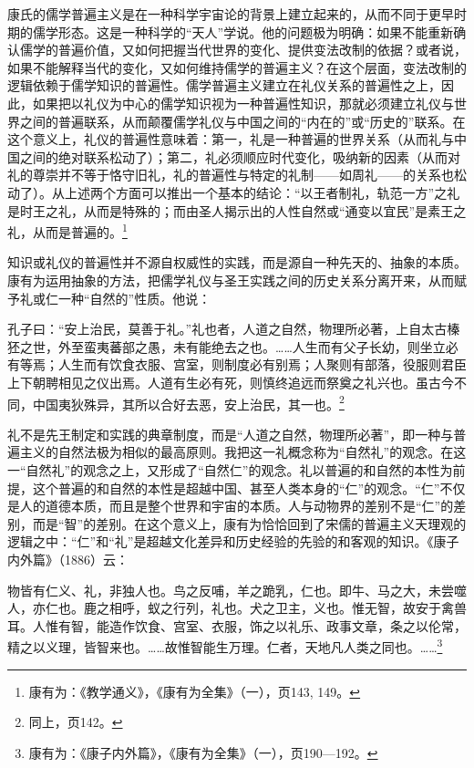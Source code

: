 \documentclass[a4paper, 12pt, openright]{ctexbook}
\renewenvironment{quote}
  {\list{}{\rightmargin2\ccwd \leftmargin2\ccwd \itemindent=2\ccwd \listparindent=2\ccwd}%
   \item\relax\small\kaishu\color{black}}
  {\endlist}
\begin{document}
康氏的儒学普遍主义是在一种科学宇宙论的背景上建立起来的，从而不同于更早时期的儒学形态。这是一种科学的“天人”学说。他的问题极为明确：如果不能重新确认儒学的普遍价值，又如何把握当代世界的变化、提供变法改制的依据？或者说，如果不能解释当代的变化，又如何维持儒学的普遍主义？在这个层面，变法改制的逻辑依赖于儒学知识的普遍性。儒学普遍主义建立在礼仪关系的普遍性之上，因此，如果把以礼仪为中心的儒学知识视为一种普遍性知识，那就必须建立礼仪与世界之间的普遍联系，从而颠覆儒学礼仪与中国之间的“内在的”或“历史的”联系。在这个意义上，礼仪的普遍性意味着：第一，礼是一种普遍的世界关系（从而礼与中国之间的绝对联系松动了）；第二，礼必须顺应时代变化，吸纳新的因素（从而对礼的尊崇并不等于恪守旧礼，礼的普遍性与特定的礼制——如周礼——的关系也松动了）。从上述两个方面可以推出一个基本的结论：“以王者制礼，轨范一方”之礼是时王之礼，从而是特殊的；而由圣人揭示出的人性自然或“通变以宜民”是素王之礼，从而是普遍的。\footnote{康有为：《教学通义》，《康有为全集》（一），页143, 149。}

知识或礼仪的普遍性并不源自权威性的实践，而是源自一种先天的、抽象的本质。康有为运用抽象的方法，把儒学礼仪与圣王实践之间的历史关系分离开来，从而赋予礼或仁一种“自然的”性质。他说：

\begin{quote}
孔子曰：“安上治民，莫善于礼。”礼也者，人道之自然，物理所必著，上自太古榛狉之世，外至蛮夷蕃部之愚，未有能绝去之也。……人生而有父子长幼，则坐立必有等焉；人生而有饮食衣服、宫室，则制度必有别焉；人聚则有部落，役服则君臣上下朝聘相见之仪出焉。人道有生必有死，则慎终追远而祭奠之礼兴也。虽古今不同，中国夷狄殊异，其所以合好去恶，安上治民，其一也。\footnote{同上，页142。}
\end{quote}

礼不是先王制定和实践的典章制度，而是“人道之自然，物理所必著”，即一种与普遍主义的自然法极为相似的最高原则。我把这一礼概念称为“自然礼”的观念。在这一“自然礼”的观念之上，又形成了“自然仁”的观念。礼以普遍的和自然的本性为前提，这个普遍的和自然的本性是超越中国、甚至人类本身的“仁”的观念。“仁”不仅是人的道德本质，而且是整个世界和宇宙的本质。人与动物界的差别不是“仁”的差别，而是“智”的差别。在这个意义上，康有为恰恰回到了宋儒的普遍主义天理观的逻辑之中：“仁”和“礼”是超越文化差异和历史经验的先验的和客观的知识。《康子内外篇》（1886）云：

\begin{quote}
物皆有仁义、礼，非独人也。鸟之反哺，羊之跪乳，仁也。即牛、马之大，未尝噬人，亦仁也。鹿之相呼，蚁之行列，礼也。犬之卫主，义也。惟无智，故安于禽兽耳。人惟有智，能造作饮食、宫室、衣服，饰之以礼乐、政事文章，条之以伦常，精之以义理，皆智来也。……故惟智能生万理。仁者，天地凡人类之同也。……\footnote{康有为：《康子内外篇》，《康有为全集》（一），页190—192。}
\end{quote}
\end{document}
